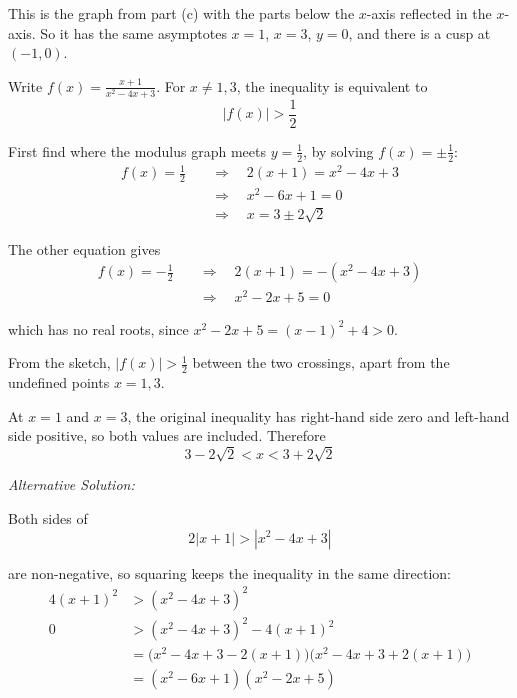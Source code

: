\documentclass[leqno]{article}
\begin{document}
\begin{enumerate}[
  label=\textbf{\arabic*.},
  leftmargin=*,
  topsep=0pt,
  partopsep=0pt,
  parsep=0pt
]
\begin{djsSolution}
\begin{enumerate}[label=\textbf{(\alph*)}]

  This is the graph from part (c) with the parts below the \(x\)-axis reflected in the \(x\)-axis. So it has the same asymptotes \(x=1\), \(x=3\), \(y=0\), and there is a cusp at \((-1,0)\).

  Write \(f(x)=\frac{x+1}{x^2-4x+3}\). For \(x\ne1,3\), the inequality is equivalent to
  \[
  |f(x)|>\frac12
  \]

  First find where the modulus graph meets \(y=\frac12\), by solving \(f(x)=\pm\frac12\):
  \begin{align*}
  f(x)=\frac12&\quad\Longrightarrow\quad 2(x+1)=x^2-4x+3\\
  &\quad\Longrightarrow\quad x^2-6x+1=0\\
  &\quad\Longrightarrow\quad x=3\pm2\sqrt2
  \end{align*}

  The other equation gives
  \begin{align*}
  f(x)=-\frac12&\quad\Longrightarrow\quad 2(x+1)=-(x^2-4x+3)\\
  &\quad\Longrightarrow\quad x^2-2x+5=0
  \end{align*}

  which has no real roots, since \(x^2-2x+5=(x-1)^2+4>0\).

  From the sketch, \(|f(x)|>\frac12\) between the two crossings, apart from the undefined points \(x=1,3\).

  At \(x=1\) and \(x=3\), the original inequality has right-hand side zero and left-hand side positive, so both values are included. Therefore
  \[
  3-2\sqrt2<x<3+2\sqrt2
  \]

{\setlength{\parskip}{8pt}%
\textit{Alternative Solution:}

Both sides of
\[
2|x+1|>|x^2-4x+3|
\]

are non-negative, so squaring keeps the inequality in the same direction:
  \begin{align*}
  4(x+1)^2 &> (x^2-4x+3)^2\\
  0 &> (x^2-4x+3)^2-4(x+1)^2\\
  &=\bigl(x^2-4x+3-2(x+1)\bigr)\bigl(x^2-4x+3+2(x+1)\bigr)\\
  &=(x^2-6x+1)(x^2-2x+5)
  \end{align*}

}
\end{enumerate}
\end{djsSolution}
\end{enumerate}
\end{document}
